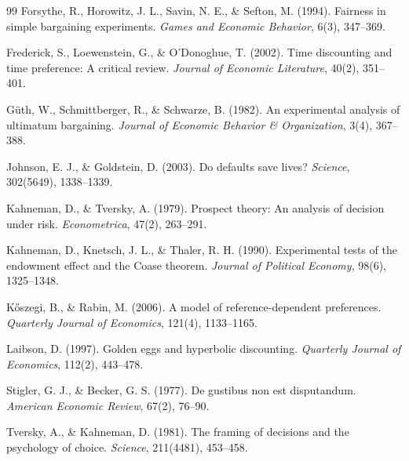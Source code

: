 \documentclass[12pt]{article}
\begin{document}
\begin{thebibliography}{99}
Forsythe, R., Horowitz, J. L., Savin, N. E., \& Sefton, M. (1994).
Fairness in simple bargaining experiments.
\textit{Games and Economic Behavior}, 6(3), 347--369.

Frederick, S., Loewenstein, G., \& O'Donoghue, T. (2002).
Time discounting and time preference: A critical review.
\textit{Journal of Economic Literature}, 40(2), 351--401.

G\"{u}th, W., Schmittberger, R., \& Schwarze, B. (1982).
An experimental analysis of ultimatum bargaining.
\textit{Journal of Economic Behavior \& Organization}, 3(4), 367--388.

Johnson, E. J., \& Goldstein, D. (2003).
Do defaults save lives?
\textit{Science}, 302(5649), 1338--1339.

Kahneman, D., \& Tversky, A. (1979).
Prospect theory: An analysis of decision under risk.
\textit{Econometrica}, 47(2), 263--291.

Kahneman, D., Knetsch, J. L., \& Thaler, R. H. (1990).
Experimental tests of the endowment effect and the Coase theorem.
\textit{Journal of Political Economy}, 98(6), 1325--1348.

K\H{o}szegi, B., \& Rabin, M. (2006).
A model of reference-dependent preferences.
\textit{Quarterly Journal of Economics}, 121(4), 1133--1165.

Laibson, D. (1997).
Golden eggs and hyperbolic discounting.
\textit{Quarterly Journal of Economics}, 112(2), 443--478.

Stigler, G. J., \& Becker, G. S. (1977).
De gustibus non est disputandum.
\textit{American Economic Review}, 67(2), 76--90.

Tversky, A., \& Kahneman, D. (1981).
The framing of decisions and the psychology of choice.
\textit{Science}, 211(4481), 453--458.

\end{thebibliography}

\end{document}

